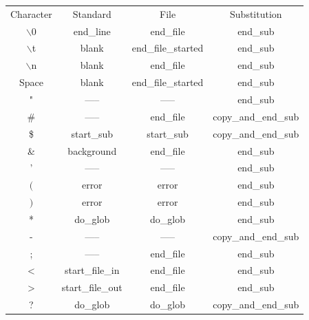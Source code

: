 \documentclass[12pt,a4paper]{report}
\begin{document}
\begin{table}[H]
	\centering
	\begin{tabular}{ |c|c|c|c| }
		\hline
		\rowcolor{lightgray} \multicolumn{4}{|c|}{Basic Syntax Table} \\
		\hline
		Character & Standard & File \cellcolor[HTML]{BEE9F9}& Substitution \cellcolor[HTML]{FFF49C}\\
		\hline
		$\backslash$0 & end\_line & end\_file \cellcolor[HTML]{BEE9F9}&  end\_sub \cellcolor[HTML]{FFF49C}\\
		$\backslash$t & blank & end\_file\_started \cellcolor[HTML]{BEE9F9}&  end\_sub \cellcolor[HTML]{FFF49C}\\
		$\backslash$n & blank & end\_file \cellcolor[HTML]{BEE9F9}&  end\_sub \cellcolor[HTML]{FFF49C}\\
		Space & blank & end\_file\_started \cellcolor[HTML]{BEE9F9}&  end\_sub\cellcolor[HTML]{FFF49C}\\
		" & ----- & ----- &  end\_sub\cellcolor[HTML]{FFF49C}\\
		\# & ----- & end\_file \cellcolor[HTML]{BEE9F9}& copy\_and\_end\_sub \cellcolor[HTML]{FFF49C}\\
		\$ & start\_sub \cellcolor[HTML]{FFF49C}& start\_sub \cellcolor[HTML]{FFF49C} & copy\_and\_end\_sub \cellcolor[HTML]{FFF49C}\\
		\& & background & end\_file \cellcolor[HTML]{BEE9F9}&  end\_sub\cellcolor[HTML]{FFF49C}\\
		' & ----- & ----- &  end\_sub\cellcolor[HTML]{FFF49C}\\
		$($ & error \cellcolor[HTML]{FF0044}& error \cellcolor[HTML]{FF0044} & end\_sub \cellcolor[HTML]{FFF49C}\\
		$)$ & error \cellcolor[HTML]{FF0044}& error \cellcolor[HTML]{FF0044} & end\_sub \cellcolor[HTML]{FFF49C}\\
		* & do\_glob & do\_glob & end\_sub\cellcolor[HTML]{FFF49C} \\
		- & ----- & ----- &  copy\_and\_end\_sub \cellcolor[HTML]{FFF49C}\\
		; & ----- & end\_file\cellcolor[HTML]{BEE9F9} &  end\_sub \cellcolor[HTML]{FFF49C}\\
		< & start\_file\_in \cellcolor[HTML]{BEE9F9}& end\_file\cellcolor[HTML]{BEE9F9}&  end\_sub \cellcolor[HTML]{FFF49C}\\
		> & start\_file\_out \cellcolor[HTML]{BEE9F9}& end\_file \cellcolor[HTML]{BEE9F9}&  end\_sub \cellcolor[HTML]{FFF49C}\\
		? & do\_glob & do\_glob & copy\_and\_end\_sub \cellcolor[HTML]{FFF49C}\\

\end{tabular}
\end{table}
\end{document}
